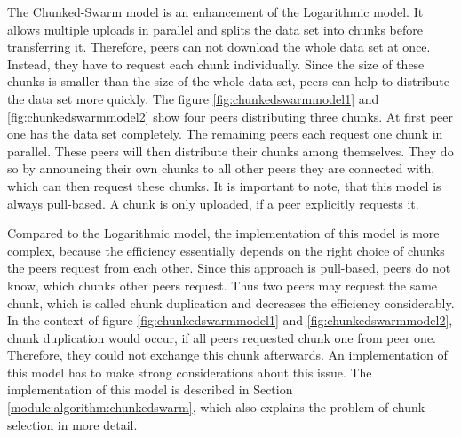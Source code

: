 The Chunked-Swarm model is an enhancement of the Logarithmic model. It allows multiple uploads in parallel and splits the data set into chunks before transferring it. Therefore, peers can not download the whole data set at once. Instead, they have to request each chunk individually. Since the size of these chunks is smaller than the size of the whole data set, peers can help to distribute the data set more quickly. The figure \ref{fig:chunkedswarmmodel1} and \ref{fig:chunkedswarmmodel2} show four peers distributing three chunks. At first peer one has the data set completely. The remaining peers each request one chunk in parallel. These peers will then distribute their chunks among themselves. They do so by announcing their own chunks to all other peers they are connected with, which can then request these chunks. It is important to note, that this model is always pull-based. A chunk is only uploaded, if a peer explicitly requests it.

Compared to the Logarithmic model, the implementation of this model is more complex, because the efficiency essentially depends on the right choice of chunks the peers request from each other. Since this approach is pull-based, peers do not know, which chunks other peers request. Thus two peers may request the same chunk, which is called chunk duplication and decreases the efficiency considerably. In the context of figure \ref{fig:chunkedswarmmodel1} and \ref{fig:chunkedswarmmodel2}, chunk duplication would occur, if all peers requested chunk one from peer one. Therefore, they could not exchange this chunk afterwards. An implementation of this model has to make strong considerations about this issue. The implementation of this model is described in Section \ref{module:algorithm:chunkedswarm}, which also explains the problem of chunk selection in more detail. 

